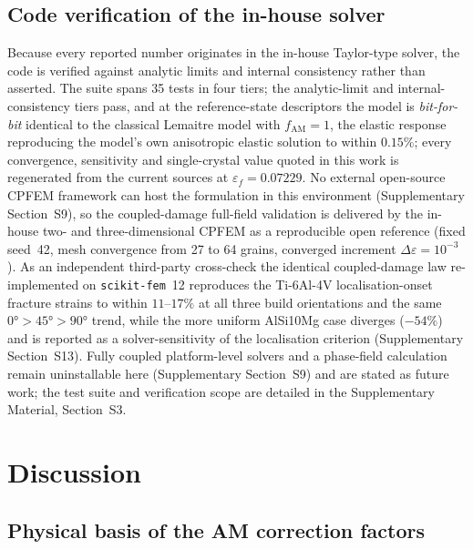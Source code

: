 \subsection{Code verification of the in-house solver}
\label{sec:code_verification}

Because every reported number originates in the in-house Taylor-type solver, the code is verified against analytic limits and internal consistency rather than asserted. The suite spans 35 tests in four tiers; the analytic-limit and internal-consistency tiers pass, and at the reference-state descriptors the model is \emph{bit-for-bit} identical to the classical Lemaitre model with $f_{\mathrm{AM}} = 1$, the elastic response reproducing the model's own anisotropic elastic solution to within $0.15\%$; every convergence, sensitivity and single-crystal value quoted in this work is regenerated from the current sources at $\varepsilon_f = 0.07229$. No external open-source CPFEM framework can host the formulation in this environment (Supplementary Section~S9), so the coupled-damage full-field validation is delivered by the in-house two- and three-dimensional CPFEM as a reproducible open reference (fixed seed~42, mesh convergence from 27 to 64 grains, converged increment $\Delta\varepsilon = 10^{-3}$). As an independent third-party cross-check the identical coupled-damage law re-implemented on \texttt{scikit-fem}~12 reproduces the Ti-6Al-4V localisation-onset fracture strains to within $11$--$17\%$ at all three build orientations and the same $\ang{0}>\ang{45}>\ang{90}$ trend, while the more uniform AlSi10Mg case diverges ($-54\%$) and is reported as a solver-sensitivity of the localisation criterion (Supplementary Section~S13). Fully coupled platform-level solvers and a phase-field calculation remain uninstallable here (Supplementary Section~S9) and are stated as future work; the test suite and verification scope are detailed in the Supplementary Material, Section~S3.

\section{Discussion}
\label{sec:discussion}


\subsection{Physical basis of the AM correction factors}
\label{sec:phys_basis}

